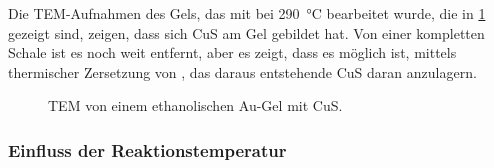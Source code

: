 	Die TEM-Aufnahmen des Gels, das mit  bei \SI{290}{\degreeCelsius} bearbeitet wurde, die in \cref{fig:E-Cu} gezeigt sind, zeigen, dass sich CuS am Gel gebildet hat.
	Von einer kompletten Schale ist es noch weit entfernt, aber es zeigt, dass es möglich ist, mittels  thermischer Zersetzung von , das daraus entstehende CuS daran anzulagern.
	
	\begin{figure}[H]
		\centering
		\caption{TEM von einem ethanolischen Au-Gel mit CuS.}
		\label{fig:E-Cu}
	\end{figure}


	\subsubsection{Einfluss der Reaktionstemperatur}
		
